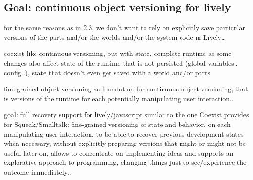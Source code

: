 \subsection{Goal: continuous object versioning for lively}

for the same reasons as in 2.3, we don’t want to rely on explicitly save particular versions of the parts and/or the worlds and/or the system code in Lively…

coexist-like continuous versioning, but with state, complete runtime as some changes also affect state of the runtime that is not persisted (global variables.. config..), state that doesn’t even get saved with a world and/or parts

fine-grained object versioning as foundation for continuous object versioning, that is versions of the runtime for each potentially manipulating user interaction..

goal: full recovery support for lively/javascript similar to the one Coexist provides for Squeak/Smalltalk: fine-grained versioning of state and behavior, on each manipulating user interaction, to be able to recover previous development states when necessary, without explicitly preparing versions that might or might not be useful later-on, allows to concentrate on implementing ideas and supports an explorative approach to programming, changing things just to see/experience the outcome immediately..
